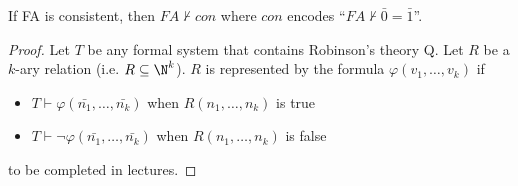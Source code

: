 \documentclass{article}
\begin{document}
\begin{theorem}
    If FA is consistent,
    then \(FA \nvdash con\) where \(con\) encodes ``\(FA \nvdash \bar{0} = \bar{1}\)''.
\end{theorem}
\begin{proof}
    Let \(T\) be any formal system that contains
    Robinson's theory Q.
    Let \(R\) be a \(k\)-ary relation (i.e. \(R\subseteq\N^k\)).
    \(R\) is represented by the formula
    \(\varphi(v_1,\ldots,v_k)\) if
    \begin{itemize}
        \item  \(T \vdash \varphi(\bar{n_1},\ldots,\bar{n_k})\) when \(R(n_1,\ldots,n_k)\) is true
        \item  \(T \vdash \lnot\varphi(\bar{n_1},\ldots,\bar{n_k})\) when \(R(n_1,\ldots,n_k)\) is false
    \end{itemize}
    to be completed in lectures.
\end{proof}
\end{document}
